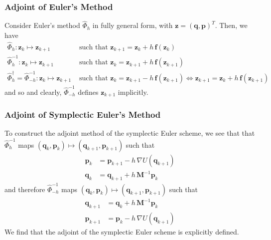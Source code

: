 \documentclass{article}
\begin{document}
    \subsubsection{Adjoint of Euler's Method}

      Consider Euler's method $\hat{\Phi}_{h}$ in fully general form, with $\mathbf{z} = (\mathbf{q}, \mathbf{p})^T$. Then, we have 
      \begin{align*}
        \hat{\Phi}_{h}: \mathbf{z}_k \mapsto \mathbf{z}_{k+1} & \text{ such that } \mathbf{z}_{k + 1} = \mathbf{z}_k + h \,\mathbf{f}( \mathbf{z}_k) \\
        \hat{\Phi}_{h}^{-1}: \mathbf{z}_k \mapsto \mathbf{z}_{k+1} & \text{ such that } \mathbf{z}_{k} = \mathbf{z}_{k+1} + h \,\mathbf{f}( \mathbf{z}_{k+1}) \\
        \hat{\Phi}_h^\dagger = \hat{\Phi}_{-h}^{-1}: \mathbf{z}_k \mapsto \mathbf{z}_{k+1} & \text{ such that } \mathbf{z}_{k} = \mathbf{z}_{k+1} - h \,\mathbf{f}( \mathbf{z}_{k+1}) \iff \mathbf{z}_{k+1} = \mathbf{z}_k + h\, \mathbf{f}(\mathbf{z}_{k+1}) 
      \end{align*}
      and so 
      and clearly, $\hat{\Phi}_{-h}^{-1}$ defines $\mathbf{z}_{k+1}$ implicitly. 

    \subsubsection{Adjoint of Symplectic Euler's Method}

      To construct the adjoint method of the symplectic Euler scheme, we see that that $\hat{\Phi}_{h}^{-1}$ maps $(\mathbf{q}_k, \mathbf{p}_k) \mapsto (\mathbf{q}_{k+1}, \mathbf{p}_{k+1})$ such that
      \begin{align*}
        \mathbf{p}_k & = \mathbf{p}_{k+1} - h \, \nabla U(\mathbf{q}_{k+1}) \\
        \mathbf{q}_k & = \mathbf{q}_{k+1} + h \, \mathbf{M}^{-1} \mathbf{p}_{k} 
      \end{align*}
      and therefore $\hat{\Phi}_{- h}^{-1}$ maps $(\mathbf{q}_k, \mathbf{p}_k) \mapsto (\mathbf{q}_{k+1}, \mathbf{p}_{k+1})$ such that
      \begin{align*}
        \mathbf{q}_{k+1} & = \mathbf{q}_k + h \, \mathbf{M}^{-1} \mathbf{p}_k \\
        \mathbf{p}_{k+1} & = \mathbf{p}_k - h \, \nabla U (\mathbf{q}_{k+1})
      \end{align*}
      We find that the adjoint of the symplectic Euler scheme is explicitly defined. 
\end{document}
